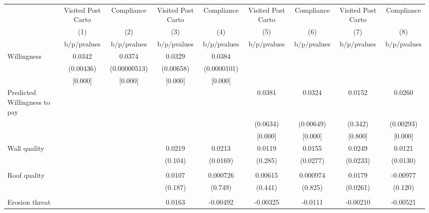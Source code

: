 {
\def\sym#1{\ifmmode^{#1}\else\(^{#1}\)\fi}
\begin{tabular}{l*{8}{c}}
\toprule
                &\multicolumn{1}{c}{Visited Post Carto}&\multicolumn{1}{c}{Compliance}&\multicolumn{1}{c}{Visited Post Carto}&\multicolumn{1}{c}{Compliance}&\multicolumn{1}{c}{Visited Post Carto}&\multicolumn{1}{c}{Compliance}&\multicolumn{1}{c}{Visited Post Carto}&\multicolumn{1}{c}{Compliance}\\
                &\multicolumn{1}{c}{(1)}&\multicolumn{1}{c}{(2)}&\multicolumn{1}{c}{(3)}&\multicolumn{1}{c}{(4)}&\multicolumn{1}{c}{(5)}&\multicolumn{1}{c}{(6)}&\multicolumn{1}{c}{(7)}&\multicolumn{1}{c}{(8)}\\
                &b/p/pvalues&b/p/pvalues&b/p/pvalues&b/p/pvalues&b/p/pvalues&b/p/pvalues&b/p/pvalues&b/p/pvalues\\
\midrule
Willingness     &   0.0342&   0.0374&   0.0329&   0.0384&         &         &         &         \\
                &(0.00436)&(0.00000513)&(0.00658)&(0.0000101)&         &         &         &         \\
                &  [0.000]&  [0.000]&  [0.000]&  [0.000]&         &         &         &         \\
Predicted Willingness to pay&         &         &         &         &   0.0381&   0.0324&   0.0152&   0.0260\\
                &         &         &         &         & (0.0634)&(0.00649)&  (0.342)&(0.00293)\\
                &         &         &         &         &  [0.000]&  [0.000]&  [0.800]&  [0.000]\\
Wall quality    &         &         &   0.0219&   0.0213&   0.0119&   0.0155&   0.0249&   0.0121\\
                &         &         &  (0.104)& (0.0169)&  (0.285)& (0.0277)& (0.0233)& (0.0130)\\
                &         &         &         &         &         &         &         &         \\
Roof quality    &         &         &   0.0107& 0.000726&  0.00615& 0.000974&   0.0179& -0.00977\\
                &         &         &  (0.187)&  (0.749)&  (0.441)&  (0.825)& (0.0261)&  (0.120)\\
                &         &         &         &         &         &         &         &         \\
Erosion threat  &         &         &   0.0163& -0.00492& -0.00325&  -0.0111& -0.00210& -0.00521\\

\end{tabular}}
